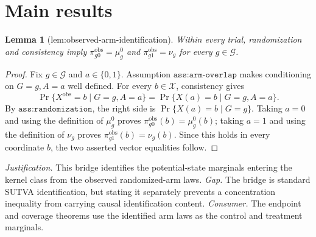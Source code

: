 \documentclass{article}
\newtheorem{lemma}{Lemma}
\begin{document}
\section{Main results}

\begin{lemma}[lem:observed-arm-identification]\label{lem:observed-arm-identification}
Within every trial, randomization and consistency imply \(\pi_{g0}^{\mathrm{obs}}=\mu_g^0\) and \(\pi_{g1}^{\mathrm{obs}}=\nu_g\) for every \(g\in\mathcal G\).
\end{lemma}
\begin{proof}
Fix \(g\in\mathcal G\) and \(a\in\{0,1\}\).  Assumption \(\texttt{ass:arm-overlap}\) makes conditioning on \(G=g,A=a\) well defined.  For every \(b\in\mathcal X\), consistency gives
\[
 \Pr\{X^{\mathrm{obs}}=b\mid G=g,A=a\}
 =\Pr\{X(a)=b\mid G=g,A=a\}.
\]
By \(\texttt{ass:randomization}\), the right side is
\(\Pr\{X(a)=b\mid G=g\}\).  Taking \(a=0\) and using the definition of \(\mu_g^0\) proves \(\pi_{g0}^{\mathrm{obs}}(b)=\mu_g^0(b)\); taking \(a=1\) and using the definition of \(\nu_g\) proves \(\pi_{g1}^{\mathrm{obs}}(b)=\nu_g(b)\).  Since this holds in every coordinate \(b\), the two asserted vector equalities follow.
\end{proof}
\par\smallskip\noindent \textit{Justification.} This bridge identifies the potential-state marginals entering the kernel class from the observed randomized-arm laws. \textit{Gap.} The bridge is standard SUTVA identification, but stating it separately prevents a concentration inequality from carrying causal identification content. \textit{Consumer.} The endpoint and coverage theorems use the identified arm laws as the control and treatment marginals.
\end{document}
